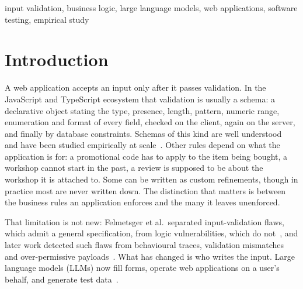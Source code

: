 \documentclass[journal]{IEEEtran}
\begin{document}
\begin{IEEEkeywords}
input validation, business logic, large language models, web applications, software testing,
empirical study
\end{IEEEkeywords}

\IEEEpeerreviewmaketitle

\section{Introduction}

A web application accepts an input only after it passes validation. In the JavaScript and TypeScript
ecosystem that validation is usually a schema: a declarative object stating the type, presence, length,
pattern, numeric range, enumeration and format of every field, checked on the client, again on the
server, and finally by database constraints. Schemas of this kind are well
understood~\cite{pezoa2016foundations,attouche2023jsonschema} and have been studied empirically at
scale~\cite{baazizi2021usagenot}. Other rules depend on what the application is for: a promotional code
has to apply to the item being bought, a workshop cannot start in the past, a review is supposed to be
about the workshop it is attached to. Some can be written as custom refinements, though in practice
most are never written down. The distinction that matters is between the business rules an application
enforces and the many it leaves unenforced.

That limitation is not new: Felmetsger et al.\ separated input-validation flaws, which admit a
general specification, from logic vulnerabilities, which do not~\cite{felmetsger2010waler}, and later
work detected such flaws from behavioural traces, validation mismatches and over-permissive
payloads~\cite{pellegrino2014logicflaws,bisht2010notamper,corradini2023massassignment}. What has
changed is who writes the input. Large language models (LLMs) now fill forms, operate web applications
on a user's behalf, and generate test data~\cite{li2026webformtest,alian2024formnexus,li2025formfactory}.
\end{document}
